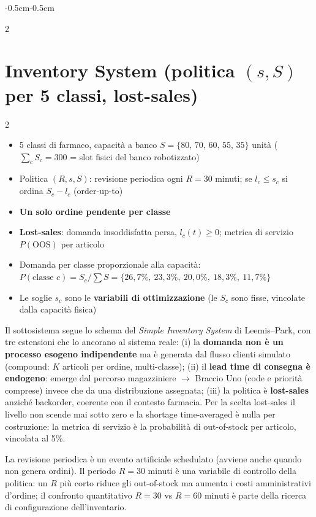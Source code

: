\documentclass{article}
\newcommand{\beforesectiongap}{\vspace*{\baselineskip}}
\begin{document}
\begin{adjustwidth}{-0.5cm}{-0.5cm}
\begin{multicols}{2}
\end{multicols}
\beforesectiongap
\newpage
\section*{Inventory System (politica $(s,S)$ per 5 classi, lost-sales)}
\begin{multicols}{2}
\begin{itemize}
    \item[\ding{112}] 5 classi di farmaco, capacità a banco $S = \{80,\,70,\,60,\,55,\,35\}$
    unità ($\sum_c S_c = 300$ = slot fisici del banco robotizzato)
    \item[\ding{112}] Politica $(R,s,S)$: revisione periodica ogni $R = 30$ minuti; se
    $l_c \le s_c$ si ordina $S_c - l_c$ (order-up-to)
    \item[\ding{112}] \textbf{Un solo ordine pendente per classe}
    \item[\ding{112}] \textbf{Lost-sales}: domanda insoddisfatta persa, $l_c(t) \ge 0$; metrica di
    servizio $P(\text{OOS})$ per articolo
    \item[\ding{112}] Domanda per classe proporzionale alla capacità:
    $P(\text{classe } c) = S_c / \sum S = \{26{,}7\%,\ 23{,}3\%,\ 20{,}0\%,\ 18{,}3\%,\ 11{,}7\%\}$
    \item[\ding{112}] Le soglie $s_c$ sono le \textbf{variabili di ottimizzazione} (le $S_c$ sono
    fisse, vincolate dalla capacità fisica)
\end{itemize}

Il sottosistema segue lo schema del \emph{Simple Inventory System} di Leemis--Park, con tre
estensioni che lo ancorano al sistema reale: (i) la \textbf{domanda non è un processo esogeno
indipendente} ma è generata dal flusso clienti simulato (compound: $K$ articoli per ordine,
multi-classe); (ii) il \textbf{lead time di consegna è endogeno}: emerge dal percorso
magazziniere $\to$ Braccio Uno (code e priorità comprese) invece che da una distribuzione
assegnata; (iii) la politica è \textbf{lost-sales} anziché backorder, coerente con il contesto
farmacia. Per la scelta lost-sales il livello non scende mai sotto zero e la shortage
time-averaged è nulla per costruzione: la metrica di servizio è la probabilità di out-of-stock
per articolo, vincolata al 5\%.

La revisione periodica è un evento artificiale schedulato (avviene anche quando non genera
ordini). Il periodo $R=30$ minuti è una variabile di controllo della politica: un $R$ più corto
riduce gli out-of-stock ma aumenta i costi amministrativi d'ordine; il confronto quantitativo
$R=30$ vs $R=60$ minuti è parte della ricerca di configurazione dell'inventario.


\end{multicols}
\end{adjustwidth}
\end{document}
